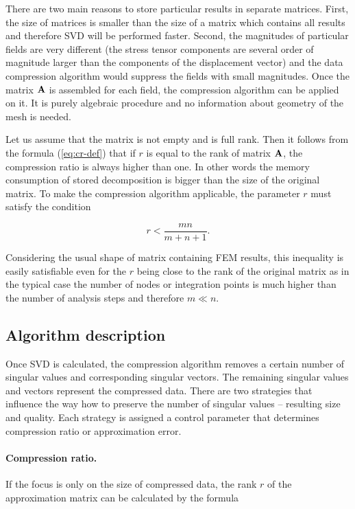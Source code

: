 There are two main reasons to store particular results in separate matrices. First, the size of matrices is smaller than the size of a matrix which contains all results and therefore SVD will be performed faster. Second, the magnitudes of particular fields are very different (the stress tensor components are several order of magnitude larger than the components of the displacement vector) and the data compression algorithm would suppress the fields with small magnitudes. Once the matrix $\mathbf{A}$ is assembled for each field, the compression algorithm can be applied on it. It is purely algebraic procedure and no information about geometry of the mesh is needed.

Let us assume that the matrix is not empty and is full rank. Then it follows from the formula (\ref{eq:cr-def}) that if $r$ is equal to the rank of matrix $\mathbf{A}$, the compression ratio is always higher than one. In other words the memory consumption of stored decomposition is bigger than the size of the original matrix. To make the compression algorithm applicable, the parameter $r$ must satisfy the condition

\begin{equation}
r<\frac{m n}{m+n+1}.
\label{eq:r-ineq}
\end{equation}

\noindent
Considering the usual shape of matrix containing FEM results, this inequality is easily satisfiable even for the $r$ being close to the rank of the original matrix as in the typical case the number of nodes or integration points is much higher than the number of analysis steps and therefore $m \ll n$.

\subsection{Algorithm description}
Once SVD is calculated, the compression algorithm removes a certain number of singular values and corresponding singular vectors. The remaining singular values and vectors represent the compressed data. There are two strategies that influence the way how to preserve the number of singular values -- resulting size and quality. Each strategy is assigned a control parameter that determines compression ratio or approximation error.

\paragraph{Compression ratio.}
If the focus is only on the size of compressed data, the rank $r$ of the approximation matrix can be calculated by the formula

